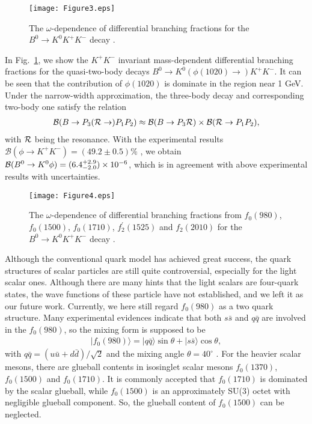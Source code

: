 \documentclass[11pt]{article}
\begin{document}
\begin{figure}[htb!]
\begin{center}
\texttt{[image: Figure3.eps]}
\caption{The $\omega$-dependence of differential branching fractions for the $B^0\to K^0K^+K^-$ decay \cite{Zou:2020atb}.}\label{Fig:2}
\end{center}
\end{figure}

In Fig.~\ref{Fig:2}, we show the $K^+K^-$ invariant mass-dependent differential branching fractions for the quasi-two-body decays $B^0\to K^0(\phi(1020) \to ) K^+K^-$. It can be seen that the contribution of $\phi(1020)$ is dominate in the region near 1 GeV. Under the narrow-width approximation, the three-body decay and corresponding two-body one satisfy the relation
\begin{eqnarray}
\mathcal{B}(B\to P_3 ({\cal R}\to)  P_1P_2)\approx\mathcal{B}(B\to P_3 {\cal R})\times\mathcal{B}({\cal R}\to P_1P_2),
\label{nwa}
\end{eqnarray}
with ${\cal R}$ being the resonance. With the experimental results $\mathcal{B}(\phi\to K^+K^-)=(49.2\pm0.5)\%$ \cite{Zyla:2020zbs}, we obtain ${\cal B}(B^0\to K^0\phi)=(6.4^{+2.9}_{-2.0})\times 10^{-6}$, which is in agreement with above experimental results with uncertainties.


\begin{figure}[htb!]
\begin{center}
\texttt{[image: Figure4.eps]}
\caption{The $\omega$-dependence of differential branching fractions from $f_0(980)$, $f_0(1500)$, $f_0(1710)$, $f_2^\prime(1525)$ and $f_2(2010)$ for the $B^0\to K^0K^+K^-$ decay \cite{Zou:2020atb}.}\label{Fig:3}
\end{center}
\end{figure}

Although the conventional quark model has achieved great success, the quark structures of scalar particles are still quite controversial, especially for the light scalar ones. Although there are many hints that the light scalars are four-quark states, the wave functions of these particle have not established, and we left it as our future work. Currently, we here still regard $f_0(980)$ as a two quark structure. Many experimental evidences indicate that both $s\bar s$ and $q\bar q$ are involved in the $f_0(980)$, so the mixing form is supposed to be
\begin{eqnarray}
|f_0(980)\rangle=|q\bar{q}\rangle\sin\theta+|s\bar{s}\rangle\cos\theta,
\end{eqnarray}
with $q\bar{q}=(u\bar{u}+d\bar{d})/\sqrt{2}$ and the mixing angle $\theta=40^{\circ}$ \cite{Cheng:2002ai}. For the heavier scalar mesons, there are glueball contents in isosinglet scalar mesons $f_0(1370)$, $f_0(1500)$ and $f_0(1710)$. It is commonly accepted that $f_0(1710)$ is dominated by the scalar glueball, while $f_0(1500)$ is an approximately SU(3) octet with negligible glueball component. So, the glueball content of $f_0(1500)$ can be neglected.
\end{document}
